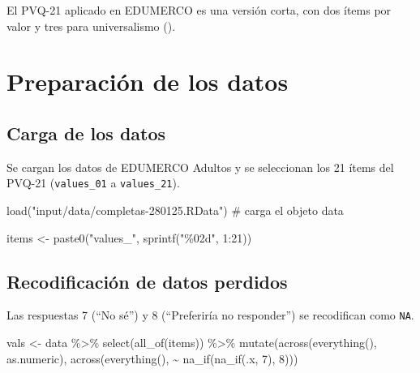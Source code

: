 \documentclass[
  spanish,
  a4paper,
  oneside]{scrbook}
\newenvironment{Shaded}{\begin{snugshade}}{\end{snugshade}}
\newcommand{\CommentTok}[1]{\textcolor[rgb]{0.37,0.37,0.37}{#1}}
\newcommand{\DecValTok}[1]{\textcolor[rgb]{0.68,0.00,0.00}{#1}}
\newcommand{\FunctionTok}[1]{\textcolor[rgb]{0.28,0.35,0.67}{#1}}
\newcommand{\NormalTok}[1]{\textcolor[rgb]{0.00,0.23,0.31}{#1}}
\newcommand{\OtherTok}[1]{\textcolor[rgb]{0.00,0.23,0.31}{#1}}
\newcommand{\SpecialCharTok}[1]{\textcolor[rgb]{0.37,0.37,0.37}{#1}}
\newcommand{\StringTok}[1]{\textcolor[rgb]{0.13,0.47,0.30}{#1}}
\begin{document}
El PVQ-21 aplicado en EDUMERCO es una versión corta, con dos ítems por
valor y tres para universalismo ().

\chapter{Preparación de los datos}\label{preparaciuxf3n-de-los-datos}

\section{Carga de los datos}\label{carga-de-los-datos}

Se cargan los datos de EDUMERCO Adultos y se seleccionan los 21 ítems
del PVQ-21 (\texttt{values\_01} a \texttt{values\_21}).

\begin{Shaded}
\begin{Highlighting}[]
\FunctionTok{load}\NormalTok{(}\StringTok{"input/data/completas{-}280125.RData"}\NormalTok{)   }\CommentTok{\# carga el objeto \textasciigrave{}data\textasciigrave{}}

\NormalTok{items }\OtherTok{\textless{}{-}} \FunctionTok{paste0}\NormalTok{(}\StringTok{"values\_"}\NormalTok{, }\FunctionTok{sprintf}\NormalTok{(}\StringTok{"\%02d"}\NormalTok{, }\DecValTok{1}\SpecialCharTok{:}\DecValTok{21}\NormalTok{))}
\end{Highlighting}
\end{Shaded}

\section{Recodificación de datos
perdidos}\label{recodificaciuxf3n-de-datos-perdidos}

Las respuestas 7 (``No sé'') y 8 (``Preferiría no responder'') se
recodifican como \texttt{NA}.

\begin{Shaded}
\begin{Highlighting}[]
\NormalTok{vals }\OtherTok{\textless{}{-}}\NormalTok{ data }\SpecialCharTok{\%\textgreater{}\%}
  \FunctionTok{select}\NormalTok{(}\FunctionTok{all\_of}\NormalTok{(items)) }\SpecialCharTok{\%\textgreater{}\%}
  \FunctionTok{mutate}\NormalTok{(}\FunctionTok{across}\NormalTok{(}\FunctionTok{everything}\NormalTok{(), as.numeric),}
         \FunctionTok{across}\NormalTok{(}\FunctionTok{everything}\NormalTok{(), }\SpecialCharTok{\textasciitilde{}} \FunctionTok{na\_if}\NormalTok{(}\FunctionTok{na\_if}\NormalTok{(.x, }\DecValTok{7}\NormalTok{), }\DecValTok{8}\NormalTok{)))}
\end{Highlighting}
\end{Shaded}
\end{document}
